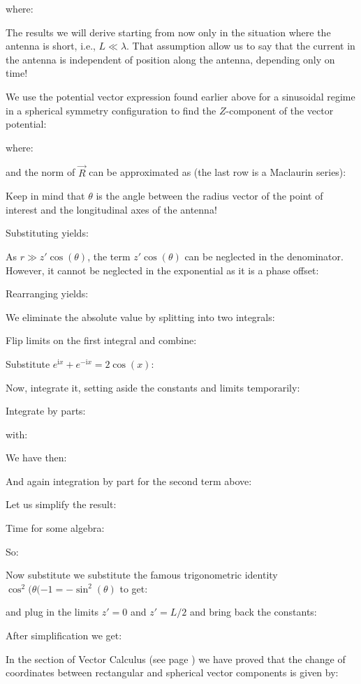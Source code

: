 	where:
	
	The results we will derive starting from now only in the situation where the antenna is short, i.e., $L\ll \lambda$. That assumption allow us to say that the current in the antenna is independent of position along the antenna, depending only on time!
	
	We use the potential vector expression found earlier above for a sinusoidal regime in a spherical symmetry configuration to find the $Z$-component of the vector potential:
	
	where:
	
	and the norm of $\vec{R}$ can be approximated as (the last row is a Maclaurin series):
	
	Keep in mind that $\theta$ is the angle between the radius vector of the point of interest and the longitudinal axes of the antenna!
	
	Substituting yields:
	
	As $ r \gg z' \cos (\theta) $, the term $z' \cos(\theta) $ can be neglected in the denominator. However, it cannot be neglected in the exponential as it is a phase offset:
	
	Rearranging yields:
	
	We eliminate the absolute value by splitting into two integrals:
	
	Flip limits on the first integral and combine:
	
	Substitute $ e^{\mathrm{i}x} + e^{-\mathrm{i}x} = 2 \cos(x)$:
	
	Now, integrate it, setting aside the constants and limits temporarily:
	
	Integrate by parts:
	
	with:
	
	We have then:
	
	And again integration by part for the second term above:
	
	Let us simplify the result:
	
	Time for some algebra:
	
	So:
	
	Now substitute we substitute the famous trigonometric identity $\cos^2 (\theta( - 1 = -\sin^2 (\theta)$ to get:
	
	and plug in the limits $ z' = 0 $ and $ z' = L/2$ and bring back the constants:
	
	After simplification we get:
	
	In the section of Vector Calculus (see page \pageref{spherical coordinates}) we have proved that the change of coordinates between rectangular and spherical vector components is given by:
	
